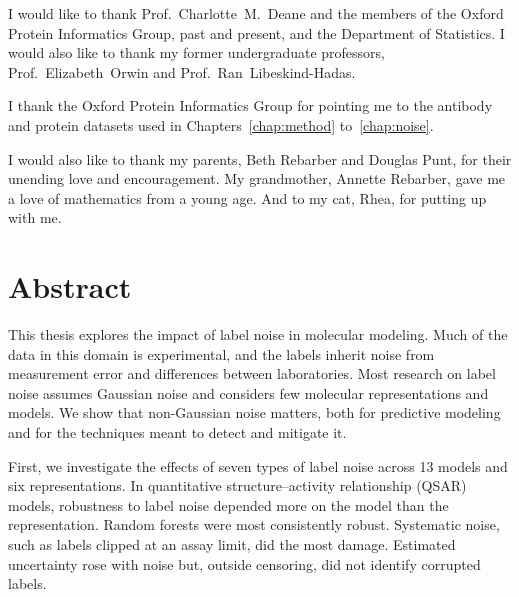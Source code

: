 \documentclass[a4paper,12pt]{report}
\begin{document}
I would like to thank Prof.~Charlotte~M.~Deane and the members of the Oxford Protein Informatics Group, past and present, and the Department of Statistics. I would also like to thank my former undergraduate professors, Prof.~Elizabeth~Orwin and Prof.~Ran~Libeskind-Hadas.

I thank the Oxford Protein Informatics Group for pointing me to the antibody and protein datasets used in Chapters~\ref{chap:method} to~\ref{chap:noise}.


I would also like to thank my parents, Beth Rebarber and Douglas Punt, for their unending love and encouragement. My grandmother, Annette Rebarber, gave me a love of mathematics from a young age. And to my cat, Rhea, for putting up with me. 


\tableofcontents

\chapter*{Abstract}

This thesis explores the impact of label noise in molecular modeling. Much of the data in this domain is experimental, and the labels inherit noise from measurement error and differences between laboratories. Most research on label noise assumes Gaussian noise and considers few molecular representations and models. We show that non-Gaussian noise matters, both for predictive modeling and for the techniques meant to detect and mitigate it.

First, we investigate the effects of seven types of label noise across 13 models and six representations. In quantitative structure--activity relationship (QSAR) models, robustness to label noise depended more on the model than the representation. Random forests were most consistently robust. Systematic noise, such as labels clipped at an assay limit, did the most damage. Estimated uncertainty rose with noise but, outside censoring, did not identify corrupted labels.
\end{document}
